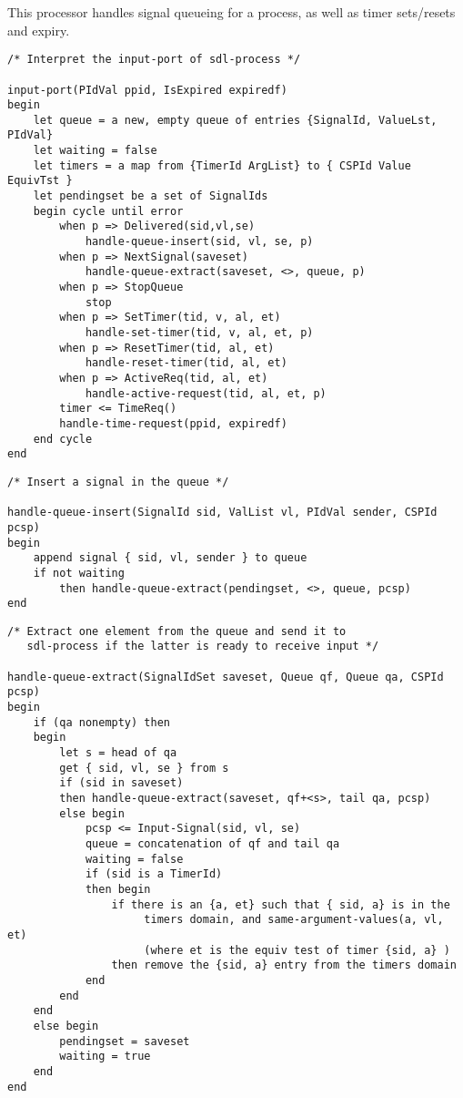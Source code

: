 This processor handles signal queueing for a process, as well as
timer sets/resets and expiry.

\begin{verbatim}
/* Interpret the input-port of sdl-process */

input-port(PIdVal ppid, IsExpired expiredf)
begin
    let queue = a new, empty queue of entries {SignalId, ValueLst, PIdVal}
    let waiting = false
    let timers = a map from {TimerId ArgList} to { CSPId Value EquivTst }
    let pendingset be a set of SignalIds
    begin cycle until error
        when p => Delivered(sid,vl,se)
            handle-queue-insert(sid, vl, se, p)
        when p => NextSignal(saveset)
            handle-queue-extract(saveset, <>, queue, p)
        when p => StopQueue
            stop
        when p => SetTimer(tid, v, al, et)
            handle-set-timer(tid, v, al, et, p)
        when p => ResetTimer(tid, al, et)
            handle-reset-timer(tid, al, et)
        when p => ActiveReq(tid, al, et)
            handle-active-request(tid, al, et, p)
        timer <= TimeReq()
        handle-time-request(ppid, expiredf)
    end cycle
end
\end{verbatim}

\begin{verbatim}
/* Insert a signal in the queue */

handle-queue-insert(SignalId sid, ValList vl, PIdVal sender, CSPId pcsp)
begin
    append signal { sid, vl, sender } to queue
    if not waiting 
        then handle-queue-extract(pendingset, <>, queue, pcsp)
end
\end{verbatim}

\begin{verbatim}
/* Extract one element from the queue and send it to
   sdl-process if the latter is ready to receive input */

handle-queue-extract(SignalIdSet saveset, Queue qf, Queue qa, CSPId pcsp)
begin
    if (qa nonempty) then
    begin
        let s = head of qa
        get { sid, vl, se } from s
        if (sid in saveset)
        then handle-queue-extract(saveset, qf+<s>, tail qa, pcsp)
        else begin
            pcsp <= Input-Signal(sid, vl, se)
            queue = concatenation of qf and tail qa
            waiting = false
            if (sid is a TimerId)
            then begin
                if there is an {a, et} such that { sid, a} is in the
                     timers domain, and same-argument-values(a, vl, et)
                     (where et is the equiv test of timer {sid, a} )
                then remove the {sid, a} entry from the timers domain
            end
        end
    end 
    else begin
        pendingset = saveset
        waiting = true
    end
end
\end{verbatim}

